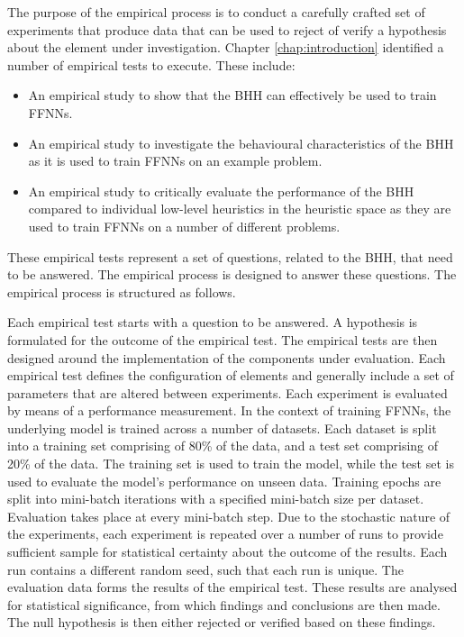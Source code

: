The purpose of the empirical process is to conduct a carefully crafted set of experiments that produce data that can be used to reject of verify a hypothesis about the element under investigation. Chapter \ref{chap:introduction} identified a number of empirical tests to execute. These include:

\begin{itemize}
      \item An empirical study to show that the \Acs{BHH} can effectively be used to train \acp{FFNN}.

      \item An empirical study to investigate the behavioural characteristics of the \Acs{BHH} as it is used to train \acp{FFNN} on an example problem.

      \item An empirical study to critically evaluate the performance of the \Acs{BHH} compared to individual low-level heuristics in the heuristic space as they are used to train \acp{FFNN} on a number of different problems.
\end{itemize}

These empirical tests represent a set of questions, related to the \acs{BHH}, that need to be answered. The empirical process is designed to answer these questions. The empirical process is structured as follows.

Each empirical test starts with a question to be answered. A hypothesis is formulated for the outcome of the empirical test. The empirical tests are then designed around the implementation of the components under evaluation. Each empirical test defines the configuration of elements and generally include a set of parameters that are altered between experiments. Each experiment is evaluated by means of a performance measurement. In the context of training \acp{FFNN}, the underlying model is trained across a number of datasets. Each dataset is split into a training set comprising of 80\% of the data, and a test set comprising of 20\% of the data. The training set is used to train the model, while the test set is used to evaluate the model's performance on unseen data. Training epochs are split into mini-batch iterations with a specified mini-batch size per dataset. Evaluation takes place at every mini-batch step. Due to the stochastic nature of the experiments, each experiment is repeated over a number of runs to provide sufficient sample for statistical certainty about the outcome of the results. Each run contains a different random seed, such that each run is unique. The evaluation data forms the results of the empirical test. These results are analysed for statistical significance, from which findings and conclusions are then made. The null hypothesis is then either rejected or verified based on these findings.

